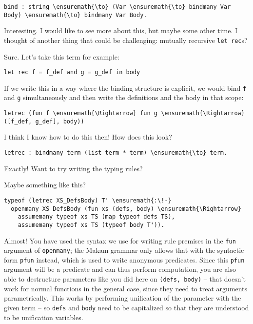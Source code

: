 \begin{verbatim}
bind : string \ensuremath{\to} (Var \ensuremath{\to} bindmany Var Body) \ensuremath{\to} bindmany Var Body.
\end{verbatim}

\heroSTUDENT{} Interesting. I would like to see more about this, but maybe
some other time. I thought of another thing that could be challenging:
mutually recursive \texttt{let\ rec}s?

\heroADVISOR{} Sure. Let's take this term for example:

\begin{verbatim}
let rec f = f_def and g = g_def in body
\end{verbatim}

\noindent
If we write this in a way where the binding structure is explicit, we
would bind \texttt{f} and \texttt{g} simultaneously and then write the
definitions and the body in that scope:

\begin{verbatim}
letrec (fun f \ensuremath{\Rightarrow} fun g \ensuremath{\Rightarrow} ([f_def, g_def], body))
\end{verbatim}

\heroSTUDENT{} I think I know how to do this then! How does this look?

\begin{verbatim}
letrec : bindmany term (list term * term) \ensuremath{\to} term.
\end{verbatim}

\heroADVISOR{} Exactly! Want to try writing the typing rules?

\heroSTUDENT{} Maybe something like this?

\begin{verbatim}
typeof (letrec XS_DefsBody) T' \ensuremath{:\!-}
  openmany XS_DefsBody (fun xs (defs, body) \ensuremath{\Rightarrow}
    assumemany typeof xs TS (map typeof defs TS),
    assumemany typeof xs TS (typeof body T')).
\end{verbatim}

\heroADVISOR{} Almost! You have used the syntax we use for writing rule
premises in the \texttt{fun} argument of \texttt{openmany}; the Makam
grammar only allows that with the syntactic form \texttt{pfun} instead,
which is used to write anonymous predicates. Since this \texttt{pfun}
argument will be a predicate and can thus perform computation, you are
also able to destructure parameters like you did here on
\texttt{(defs,\ body)} -- that doesn't work for normal functions in the
general case, since they need to treat arguments parametrically. This
works by performing unification of the parameter with the given term --
so \texttt{defs} and \texttt{body} need to be capitalized so that they
are understood to be unification variables.

